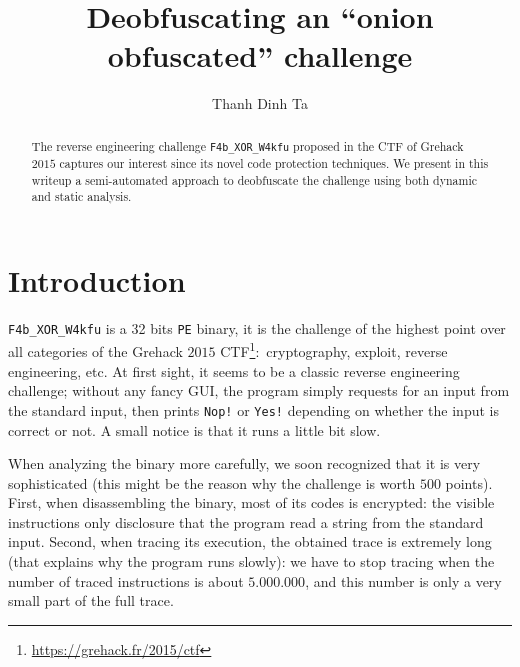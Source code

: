 \documentclass{easychair}
\begin{document}
\title{Deobfuscating an ``onion obfuscated'' challenge}

\author{
  Thanh Dinh Ta
}

\clearpage
\maketitle

\begin{abstract}
  The reverse engineering challenge \texttt{F4b\_XOR\_W4kfu} proposed in the CTF of Grehack $2015$ captures our interest since its novel code protection techniques. We present in this writeup a semi-automated approach to deobfuscate the challenge using both dynamic and static analysis.
\end{abstract}

\section{Introduction}
\label{sec:introduction}

\texttt{F4b\_XOR\_W4kfu} is a 32 bits \texttt{PE} binary, it is the challenge of the highest point over all categories of the Grehack $2015$ CTF\footnote{\url{https://grehack.fr/2015/ctf}}:~cryptography, exploit, reverse engineering, etc. At first sight, it seems to be a classic reverse engineering challenge; without any fancy GUI, the program simply requests for an input from the standard input, then prints \texttt{Nop!} or \texttt{Yes!} depending on whether the input is correct or not. A small notice is that it runs a little bit slow.

When analyzing the binary more carefully, we soon recognized that it is very sophisticated (this might be the reason why the challenge is worth $500$ points). First, when disassembling the binary, most of its codes is encrypted: the visible instructions only disclosure that the program read a string from the standard input. Second, when tracing its execution, the obtained trace is extremely long (that explains why the program runs slowly): we have to stop tracing when the number of traced instructions is about $5.000.000$, and this number is only a very small part of the full trace.
\end{document}

